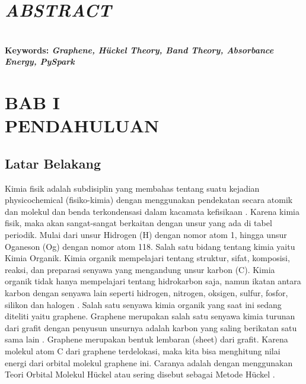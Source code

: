 \documentclass[12pt,a4paper]{report}
\renewcommand{\headrulewidth}{0pt}%
\renewcommand\headrulewidth{0pt}
\renewcommand{\headrulewidth}{0pt}
\begin{document}
\chapter*{\centering \textit{ABSTRACT}}
\thispagestyle{myplain}
\begin{spacing}{1.0}
\noindent \\
\textbf{Keywords: \textit{Graphene, Hückel Theory, Band Theory, Absorbance Energy, PySpark}}
\end{spacing}

\thispagestyle{myplain}
\fancypagestyle{plain}{%
\fancyhf{}
\renewcommand{\headrulewidth}{0pt}
\fancyfoot[C]{\thepage}
}
\newpage
\normalsize {\tableofcontents}
\newpage
\normalsize {\listoffigures}
\newpage
\normalsize {\listoftables}

\renewcommand{\thechapter}{\Roman{chapter}}
\chapter*{BAB I \\ PENDAHULUAN}
\renewcommand{\thesection}{\arabic{section}}
\setcounter{chapter}{+1}
\thispagestyle{myplain}
\setcounter{page}{8}				%

\renewcommand{\thesection}{\arabic{chapter}.\arabic{section}}
\renewcommand{\thefigure}{\arabic{chapter}.\arabic{figure}}
\renewcommand{\thetable}{\arabic{chapter}.\arabic{table}}
\renewcommand{\theequation}{\arabic{chapter}.\arabic{equation}}
	\section{Latar Belakang}
	Kimia fisik adalah subdisiplin yang membahas tentang suatu kejadian physicochemical (fisiko-kimia) dengan menggunakan pendekatan secara atomik dan molekul dan benda terkondensasi dalam kacamata kefisikaan \cite{Slater1939}. Karena kimia fisik, maka akan sangat-sangat berkaitan dengan unsur yang ada di tabel periodik. Mulai dari unsur Hidrogen (H) dengan nomor atom 1, hingga unsur Oganeson (Og) dengan nomor atom 118. Salah satu bidang tentang kimia yaitu Kimia Organik. Kimia organik mempelajari tentang struktur, sifat, komposisi, reaksi, dan preparasi senyawa yang mengandung unsur karbon (C). Kimia organik tidak hanya mempelajari tentang hidrokarbon saja, namun ikatan antara karbon dengan senyawa lain seperti hidrogen, nitrogen, oksigen, sulfur, fosfor, silikon dan halogen \cite{ACS2020}. Salah satu senyawa kimia organik yang saat ini sedang diteliti yaitu graphene. Graphene merupakan salah satu senyawa kimia turunan dari grafit dengan penyusun unsurnya adalah karbon yang saling berikatan satu sama lain \cite{Zhen2017}. Graphene merupakan bentuk lembaran (sheet) dari grafit. Karena molekul atom C dari graphene terdelokasi, maka kita bisa menghitung nilai energi dari orbital molekul graphene ini. Caranya adalah dengan menggunakan Teori Orbital Molekul Hückel atau sering disebut sebagai Metode Hückel \cite{Ribeiro}.  
	
\end{document}
